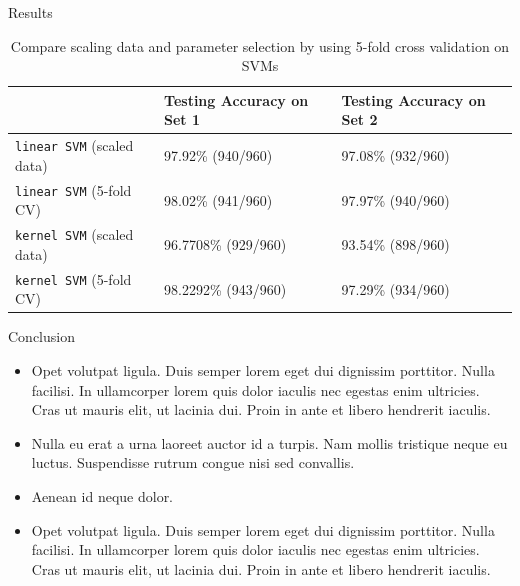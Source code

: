 \documentclass[final,hyperref={pdfpagelabels=false}]{beamer}
\begin{document}
\begin{frame}[t]
\begin{columns}[t]
\begin{column}{.465\textwidth}
\begin{block}{Results}
\begin{table}[h]
\centering
\caption{Compare scaling data and parameter selection by using 5-fold cross validation on SVMs}
\label{result2}
\begin{tabular}{l|l|l}
                                           & Testing Accuracy on Set 1 & Testing Accuracy on Set 2 \\ \hline
\texttt{linear SVM} (scaled data)                & 97.92\% (940/960)         & 97.08\% (932/960)         \\ \hline
\texttt{linear SVM} (5-fold CV) & 98.02\% (941/960)         & 97.97\% (940/960)         \\ \hline
\texttt{kernel SVM} (scaled data)                & 96.7708\% (929/960)       & 93.54\% (898/960)         \\ \hline
\texttt{kernel SVM} (5-fold CV) & 98.2292\% (943/960)       & 97.29\% (934/960)                        
\end{tabular}
\end{table}

\end{block}


\begin{block}{Conclusion}

\begin{itemize}
\item Opet volutpat ligula. Duis semper lorem eget dui dignissim porttitor. Nulla facilisi. In ullamcorper lorem quis dolor iaculis nec egestas enim ultricies. Cras ut mauris elit, ut lacinia dui. Proin in ante et libero hendrerit iaculis.
\item Nulla eu erat a urna laoreet auctor id a turpis. Nam mollis tristique neque eu luctus. Suspendisse rutrum congue nisi sed convallis. 
\item Aenean id neque dolor.
\item Opet volutpat ligula. Duis semper lorem eget dui dignissim porttitor. Nulla facilisi. In ullamcorper lorem quis dolor iaculis nec egestas enim ultricies. Cras ut mauris elit, ut lacinia dui. Proin in ante et libero hendrerit iaculis.
\end{itemize}

\end{block}



\end{column}
\end{columns}
\end{frame}
\end{document}
